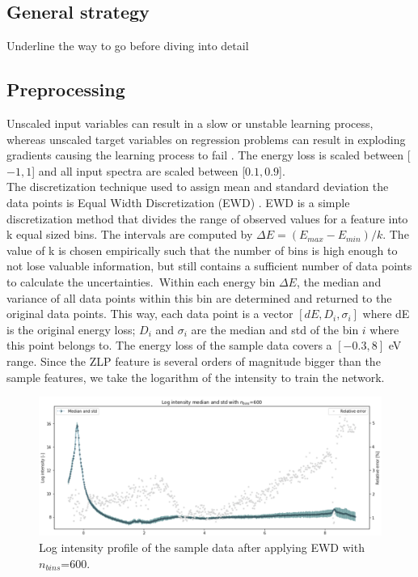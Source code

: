 \documentclass[11pt,a4paper]{article}
\numberwithin{equation}{section}
\numberwithin{figure}{section}
\numberwithin{table}{section}
\begin{document}
\subsection{General strategy}
Underline the way to go before diving into detail

\subsection{Preprocessing}
Unscaled input variables can result in a slow or unstable learning process, whereas unscaled target variables on regression problems can result in exploding gradients causing the learning process to fail \cite{juan}. The energy loss is scaled between [$-1,1$] and all input spectra are scaled between [$0.1, 0.9$]. \\

The discretization technique used to assign mean and standard deviation the data points is Equal Width Discretization (EWD) \cite{ewd}. EWD is a simple discretization method that divides the range of observed values for a feature into k equal sized bins. The intervals are computed by 
 $\Delta E = (E_{max} - E_{min}) / k$. The value of k is chosen empirically such that the number of bins is high enough to not lose valuable information, but still contains a sufficient number of data points to calculate the uncertainties.\
Within each energy bin $\Delta E$, the median and variance of all data points within this bin are determined and returned to the original data points. This way, each data point is a vector $[dE, D_i, \sigma_i]$ where dE is the original energy loss; $D_i$ and $\sigma_i$ are the median and std of the bin $i$ where this point belongs to. 
The energy loss of the sample data covers a $[-0.3, 8]$ eV range. Since the ZLP feature is several orders of magnitude bigger than the sample features, we take the logarithm of the intensity to train the network. 
\\

\begin{figure}[H]
    \centering
    \includegraphics[width=155mm]{plots/ewd.png}
    \caption{Log intensity profile of the sample data after applying EWD with $n_{bins}$=600.}
    \label{ranges}
\end{figure}
\end{document}
